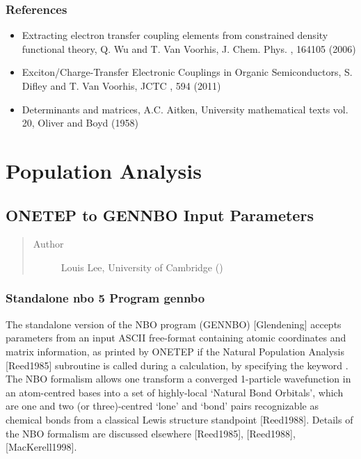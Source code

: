 \documentclass[letterpaper,10pt,english]{sphinxmanual}
\begin{document}
\subsection{References}
\label{\detokenize{ci:references}}\begin{itemize}
\item {} 
Extracting electron transfer coupling elements from constrained
density functional theory, Q. Wu and T. Van Voorhis, J. Chem. Phys.
, 164105 (2006)

\item {} 
Exciton/Charge-Transfer Electronic Couplings in Organic
Semiconductors, S. Difley and T. Van Voorhis, JCTC , 594 (2011)

\item {} 
Determinants and matrices, A.C. Aitken, University mathematical texts
vol. 20, Oliver and Boyd (1958)

\end{itemize}


\chapter{Population Analysis}
\label{\detokenize{index_population::doc}}\label{\detokenize{index_population:population-analysis}}

\section{ONETEP to GENNBO  Input Parameters}
\label{\detokenize{nbo_onetep::doc}}\label{\detokenize{nbo_onetep:onetep-to-gennbo-file-47-input-parameters}}\begin{quote}\begin{description}
\item[{Author}] \leavevmode
Louis Lee, University of Cambridge ()

\end{description}\end{quote}


\subsection{Standalone nbo 5 Program gennbo}
\label{\detokenize{nbo_onetep:standalone-nbo-5-program-gennbo}}
The standalone version of the NBO program
(GENNBO) {[}Glendening{]} accepts parameters from an input
ASCII free-format  containing atomic coordinates and matrix
information, as printed by ONETEP if the Natural Population
Analysis {[}Reed1985{]} subroutine is called during a
 calculation, by specifying the keyword .
The NBO formalism allows one transform a converged 1-particle
wavefunction in an atom-centred bases into a set of highly-local
‘Natural Bond Orbitals’, which are one and two (or three)-centred ‘lone’
and ‘bond’ pairs recognizable as chemical bonds from a classical Lewis
structure standpoint {[}Reed1988{]}.
Details of the NBO formalism are discussed
elsewhere {[}Reed1985{]}, {[}Reed1988{]}, {[}MacKerell1998{]}.
\end{document}
